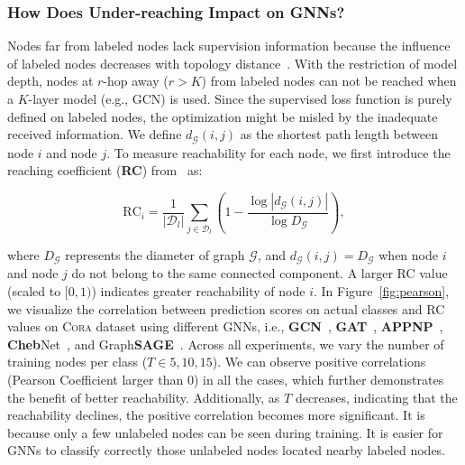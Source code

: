 \documentclass[letterpaper]{article} %
\newcommand{\labeledset}{\mathcal{D}_{l}}
\begin{document}
\subsubsection{How Does Under-reaching Impact on GNNs?}
Nodes far from labeled nodes lack supervision information because the influence of labeled nodes decreases with topology distance~\cite{influence_decay}. With the restriction of model depth, nodes at $r$-hop away ($r > K$) from labeled nodes can not be reached when a $K$-layer model (e.g., GCN) is used. Since the supervised loss function is purely defined on labeled nodes, the optimization might be misled by the inadequate received information. We define $ d_{\mathcal{G}}(i,j)$ as the shortest path length between node $i$ and node $j$. To measure reachability for each node, we first introduce the reaching coefficient (\textbf{RC}) from~\cite{pastel} as:
\begin{small}
\begin{equation}
\label{eq:rc}
	\text{RC}_{i} = \frac{1}{|\labeledset|} \sum_{j \in \labeledset} \left( 1 - \frac{\log |d_{\mathcal{G}}(i,j)|}{\log D_{\mathcal{G}}} \right),
\end{equation}
\end{small}where $D_{\mathcal{G}}$ represents the diameter of graph $\mathcal{G}$, and $d_{\mathcal{G}}(i,j) = D_{\mathcal{G}}$ when node $i$ and node $j$ do not belong to the same connected component. A larger RC value (scaled to $[0,1)$) indicates greater reachability of node $i$. In Figure~\ref{fig:pearson}, we visualize the correlation between prediction scores on actual classes and RC values on \textsc{Cora} dataset using different GNNs, i.e., \textbf{GCN}~\cite{gcn}, \textbf{GAT}~\cite{gat}, \textbf{APPNP}~\cite{appnp}, \textbf{Cheb}Net~\cite{chebnet}, and Graph\textbf{SAGE}~\cite{sage}. Across all experiments, we vary the number of training nodes per class ($T \in {5, 10, 15}$). We can observe positive correlations (Pearson Coefficient larger than 0) in all the cases, which further demonstrates the benefit of better reachability. Additionally, as $T$ decreases, indicating that the reachability declines, the positive correlation becomes more significant. It is because only a few unlabeled nodes can be seen during training. It is easier for GNNs to classify correctly those unlabeled nodes located nearby labeled nodes.
\end{document}
